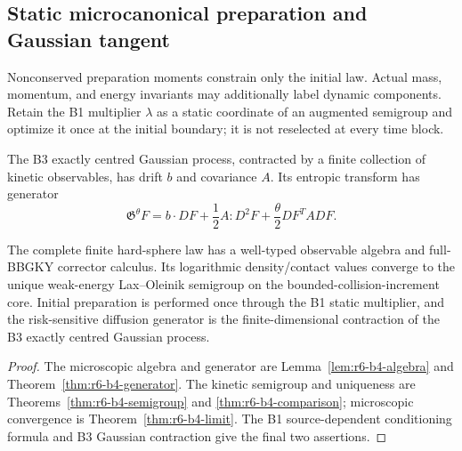 \subsection{Static microcanonical preparation and Gaussian tangent}

Nonconserved preparation moments constrain only the initial law.  Actual mass,
momentum, and energy invariants may additionally label dynamic components.
Retain the B1 multiplier \(\lambda\) as a static coordinate of an augmented
semigroup and optimize it once at the initial boundary; it is not reselected
at every time block.

The B3 exactly centred Gaussian process, contracted by a finite collection of
kinetic observables, has drift \(b\) and covariance \(A\).  Its entropic
transform has generator
\[
\mathfrak G^\theta F=b\cdot DF+\frac12A:D^2F+
\frac\theta2DF^TADF.
\]

\begin{theorem}
\label{thm:r6-b4-main}
The complete finite hard-sphere law has a well-typed observable algebra and
full-BBGKY corrector calculus.  Its logarithmic density/contact values
converge to the unique weak-energy Lax--Oleinik semigroup on the
bounded-collision-increment core.  Initial preparation is performed once
through the B1 static multiplier, and the risk-sensitive diffusion generator
is the finite-dimensional contraction of the B3 exactly centred Gaussian
process.
\end{theorem}

\begin{proof}
The microscopic algebra and generator are
Lemma~\ref{lem:r6-b4-algebra} and
Theorem~\ref{thm:r6-b4-generator}.  The kinetic semigroup and uniqueness are
Theorems~\ref{thm:r6-b4-semigroup} and
\ref{thm:r6-b4-comparison}; microscopic convergence is
Theorem~\ref{thm:r6-b4-limit}.  The B1 source-dependent conditioning formula
and B3 Gaussian contraction give the final two assertions.
\end{proof}
